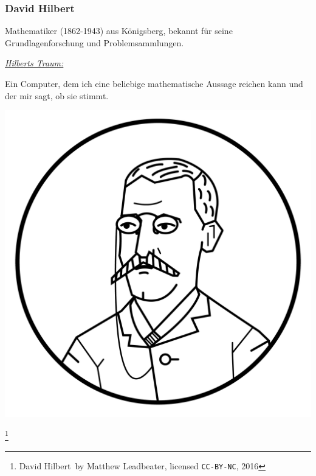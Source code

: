 \documentclass[aspectratio=43]{beamer}
\newcommand\blfootnote[1]{%
  \begingroup
  \renewcommand\thefootnote{}\footnote{#1}%
  \addtocounter{footnote}{-1}%
  \endgroup
}
\begin{document}
\begin{frame}
\frametitle{David Hilbert}

\begin{multicols}{2}

Mathematiker (1862-1943) aus Königsberg, bekannt für seine Grundlagenforschung und Problemsammlungen.
\bigskip

\emph{\underline{Hilberts Traum:}}\\\smallskip

Ein Computer, dem ich eine beliebige mathematische Aussage reichen kann und der mir sagt, ob sie stimmt. 

\columnbreak

\includegraphics[scale=0.3]{images/hilbert-circle.png} 

\end{multicols}

\blfootnote{\glqq David Hilbert\grqq\ by Matthew Leadbeater, licensed \texttt{CC-BY-NC}, 2016}

\end{frame}

\end{document}
